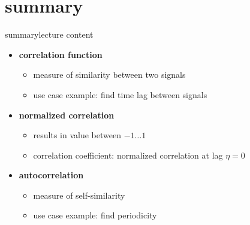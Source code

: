     \section{summary}
        \begin{frame}{summary}{lecture content}
            \begin{itemize}
                \item   \textbf{correlation function}
                    \begin{itemize}
                        \item   measure of similarity between two signals
                        \item   use case example: find time lag between signals
                    \end{itemize}
                \bigskip
                \item   \textbf{normalized correlation}
                    \begin{itemize}
                        \item   results in value between $-1\ldots 1$
                        \item   correlation coefficient: normalized correlation at lag $\eta=0$
                    \end{itemize}
                \bigskip
                \item   \textbf{autocorrelation}
                    \begin{itemize}
                        \item   measure of self-similarity
                        \item   use case example: find periodicity
                    \end{itemize}
            \end{itemize}
        \end{frame}

